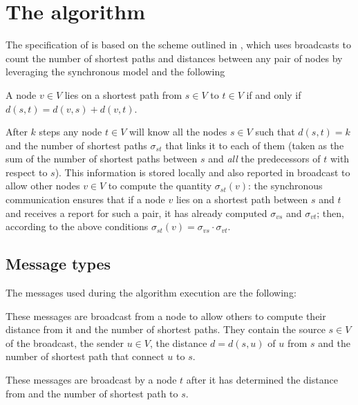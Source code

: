 
\section{The \deccen{} algorithm}
\label{sec:deccen}

The specification of \deccen{} is based on the scheme outlined in \cite{lehmann2003}, which uses broadcasts to count the number of shortest paths and distances between any pair of nodes by leveraging the synchronous model and the following
\begin{lemma}
A node $v \in V$ lies on a shortest path from $s \in V$ to $t \in V$ if and only if $d(s,t) = d(v,s) + d(v,t)$.
\end{lemma}
After $k$ steps any node $t \in V$ will know all the nodes $s \in V$ such that $d(s,t) = k$ and the number of shortest paths $\sigma_{st}$ that links it to each of them (taken as the sum of the number of shortest paths between $s$ and \emph{all} the predecessors of $t$ with respect to $s$). This information is stored locally and also reported in broadcast to allow other nodes $v \in V$ to compute the quantity $\sigma_{st}(v)$: the synchronous communication ensures that if a node $v$ lies on a shortest path between $s$ and $t$ and receives a report for such a pair, it has already computed $\sigma_{vs}$ and $\sigma_{vt}$; then, according to the above conditions $\sigma_{st}(v) = \sigma_{vs} \cdot \sigma_{vt}$.

\subsection{Message types}

The messages used during the algorithm execution are the following:
\begin{description}[leftmargin=0cm]
\item[\mdiscargs{s}{u}{d}] These messages are broadcast from a node to allow others to compute their distance from it and the number of shortest paths. They contain the source $s \in V$ of the broadcast, the sender $u \in V$, the distance $d = d(s,u)$ of $u$ from $s$ and the number of shortest path that connect $u$ to $s$.

\item[\mdecrepargs{s}{t}] These messages are broadcast by a node $t$ after it has determined the distance from and the number of shortest path to $s$.
\end{description}

